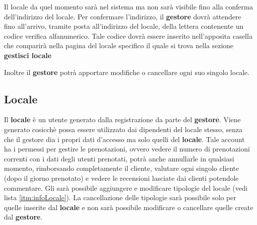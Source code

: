 Il locale da quel momento sarà nel sistema ma non sarà visibile fino alla conferma dell'indirizzo del locale. Per
confermare l'indirizzo, il \textbf{gestore} dovrà attendere fino all'arrivo, tramite posta all'indirizzo
del locale, della lettera contenente un codice verifica alfanumerico. Tale codice dovrà essere inserito nell'apposita
casella che comparirà nella pagina del locale specifico il quale si trova nella sezione \textbf{gestisci locale}

Inoltre il \textbf{gestore} potrà apportare modifiche o cancellare ogni suo singolo locale.


\subsection{Locale}

Il \textbf{locale} è un utente generato dalla registrazione da parte del \textbf{gestore}. Viene
generato cosicchè possa essere utilizzato dai dipendenti del locale stesso, senza che il gestore dia i propri dati
d'accesso ma solo quelli del \textbf{locale}. Tale account ha i permessi per gestire le prenotazioni, ovvero vedere
il numero di prenotazioni correnti con i dati degli utenti prenotati, potrà anche annullarle in qualsiasi momento,
rimborsando completamente il cliente, valutare ogni singolo cliente (dopo il giorno prenotato) e vedere le recensioni
lasciate dai clienti potendole commentare.
Gli sarà possibile aggiungere e modificare tipologie del locale (vedi lista \ref{itm:infoLocale}). La cancellazione
delle tipologie sarà possibile solo per quelle inserite dal \textbf{locale} e non sarà possibile modificare o 
cancellare quelle create dal \textbf{gestore}.


